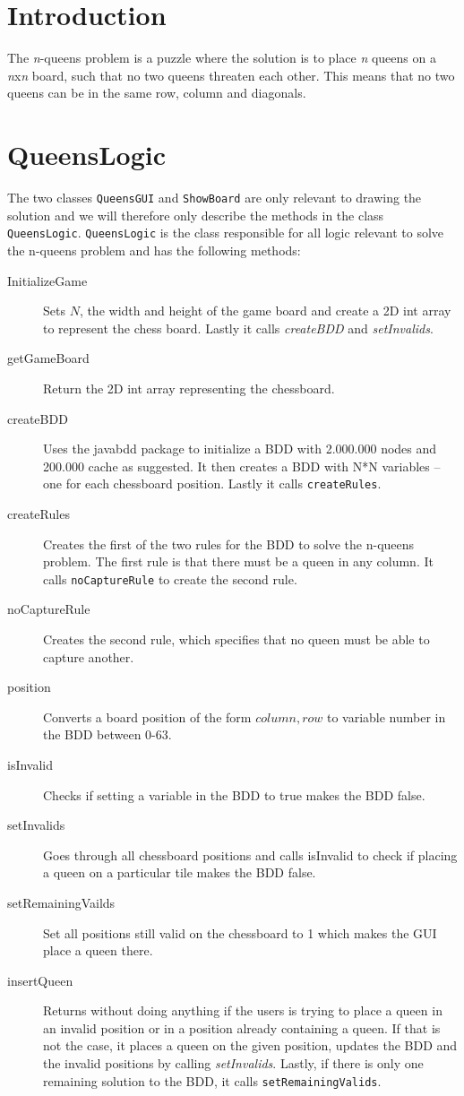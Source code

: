 \section{Introduction}
The \textit{n}-queens problem is a puzzle where the solution is to place \textit{n} queens on a \textit{n}x\textit{n} board, such that no two queens threaten each other. This means that no two queens can be in the same row, column and diagonals.
\section{QueensLogic}
The two classes \texttt{QueensGUI} and \texttt{ShowBoard} are only relevant to drawing the solution and we will therefore only describe the methods in the class \texttt{QueensLogic}. \texttt{QueensLogic} is the class responsible for all logic relevant to solve the n-queens problem and has the following methods:
\begin{description}
	\item[InitializeGame] Sets $N$, the width and height of the game board and create a 2D int array to represent the chess board. Lastly it calls \textit{createBDD} and \textit{setInvalids}.
	\item[getGameBoard] Return the 2D int array representing the chessboard.
	\item[createBDD] Uses the javabdd package to initialize a BDD with 2.000.000 nodes and 200.000 cache as suggested. It then creates a BDD with N*N variables -- one for each chessboard position. Lastly it calls \texttt{createRules}.
	\item[createRules] Creates the first of the two rules for the BDD to solve the n-queens problem. The first rule is that there must be a queen in any column. It calls \texttt{noCaptureRule} to create the second rule.
	\item[noCaptureRule] Creates the second rule, which specifies that no queen must be able to capture another.
	\item[position] Converts a board position of the form $column, row$ to variable number in the BDD between 0-63.	
	\item[isInvalid] Checks if setting a variable in the BDD to true makes the BDD false. 
	\item[setInvalids] Goes through all chessboard positions and calls isInvalid to check if placing a queen on a particular tile makes the BDD false.
	\item[setRemainingVailds] Set all positions still valid on the chessboard to 1 which makes the GUI place a queen there.
	\item[insertQueen] Returns without doing anything if the users is trying to place a queen in an invalid position or in a position already containing a queen. If that is not the case, it places a queen on the given position, updates the BDD and the invalid positions by calling \textit{setInvalids}. Lastly, if there is only one remaining solution to the BDD, it calls \texttt{setRemainingValids}.
\end{description}

